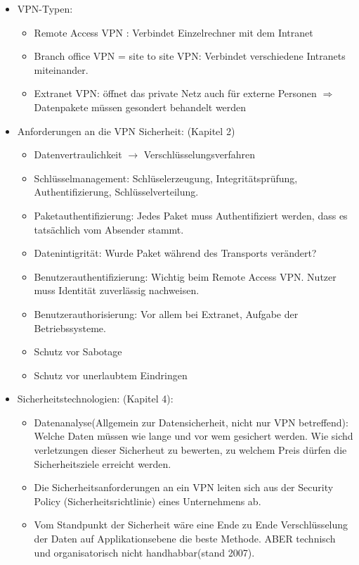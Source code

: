 \begin{itemize}
	\item VPN-Typen: \begin{itemize}	
					 \item Remote Access VPN : Verbindet Einzelrechner mit dem Intranet
					 \item Branch office VPN = site to site VPN: Verbindet verschiedene Intranets miteinander.
					 \item Extranet VPN: öffnet das private Netz auch für externe Personen \(\Rightarrow\) Datenpakete müssen gesondert behandelt werden
					 \end{itemize}	
   \item Anforderungen an die VPN Sicherheit: (Kapitel 2)
					\begin{itemize}
					\item Datenvertraulichkeit $\rightarrow$ Verschlüsselungsverfahren
					\item Schlüsselmanagement: Schlüselerzeugung, Integritätsprüfung, Authentifizierung, Schlüsselverteilung.
					\item Paketauthentifizierung: Jedes Paket muss Authentifiziert werden, dass es tatsächlich vom Absender stammt. 
					\item Datenintigrität: Wurde Paket während des Transports verändert?
					\item Benutzerauthentifizierung: Wichtig beim Remote Access VPN. Nutzer muss Identität zuverlässig nachweisen.
					\item Benutzerauthorisierung: Vor allem bei Extranet, Aufgabe der Betriebssysteme.
					\item Schutz vor Sabotage
					\item Schutz vor unerlaubtem Eindringen
					\end{itemize}
  \item Sicherheitstechnologien: (Kapitel 4): 
  					\begin{itemize}
  					\item Datenanalyse(Allgemein zur Datensicherheit, nicht nur VPN betreffend): Welche Daten müssen wie lange und vor wem gesichert werden. Wie sichd verletzungen dieser Sicherheut zu bewerten, zu welchem Preis dürfen die Sicherheitsziele erreicht werden. 
  					\item Die Sicherheitsanforderungen an ein VPN leiten sich aus der Security Policy (Sicherheitsrichtlinie) eines Unternehmens ab. 
  					\item Vom Standpunkt der Sicherheit wäre eine Ende zu Ende Verschlüsselung der Daten auf Applikationsebene die beste Methode. ABER technisch und organisatorisch nicht handhabbar(stand 2007).

\end{itemize}
\end{itemize}
